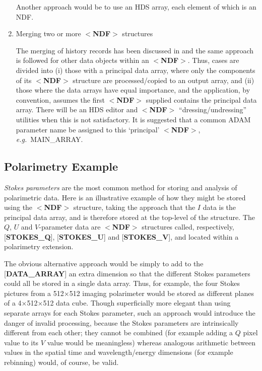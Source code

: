 \begin{enumerate}
\begin{tabbing}
\end{tabbing}

Another approach would be to use an HDS array, each
element of which is an NDF.

\item Merging two or more $<${\bf NDF}$>$ structures

The merging of history records has been discussed in
 and the same approach
is followed for other data objects within an $<${\bf NDF}$>$.
Thus, cases are divided into (i)
those with a principal data array, where only the
components of its $<${\bf NDF}$>$ structure are
processed/copied to an output array, and
(ii) those where the
data arrays have equal importance, and
the application, by convention, assumes the first $<${\bf NDF}$>$ supplied
contains the
principal data array.  There will be an HDS editor and $<${\bf NDF}$>$
``dressing/undressing'' utilities when this is not satisfactory.  It is
suggested that a common {\small ADAM} parameter name be assigned to this `principal'
$<${\bf NDF}$>$, {\it e.g.}\  MAIN\_ARRAY.
\end{enumerate}

\subsection{Polarimetry Example\label{se:expolarimetry}}

{\it Stokes parameters} are the most common method for storing and analysis
of polarimetric data.  Here is an illustrative
example of how they might be stored
using the $<${\bf NDF}$>$ structure, taking the approach that
the $I$ data is the principal data array, and is therefore
stored at the top-level of the structure.  The $Q$, $U$ and $V$-parameter data
are $<${\bf NDF}$>$ structures called, respectively,
{[}{\bf STOKES\_Q}{]}, {[}{\bf STOKES\_U}{]}
and {[}{\bf STOKES\_V}{]}, and
located within a polarimetry extension.

The obvious alternative approach would be simply to
add to the {[}{\bf DATA\_ARRAY}{]} an extra dimension so that
the different Stokes parameters could all be stored in a
single data array.  Thus, for example, the four Stokes pictures from a
512$\times$512 imaging polarimeter would be stored as different planes of a
4$\times$512$\times$512 data cube.
Though superficially more elegant than using
separate arrays for each Stokes parameter, such
an approach would introduce the danger
of invalid processing, because the Stokes
parameters are intrinsically different from each other; they cannot
be combined (for example adding a $Q$ pixel
value to its $V$ value would be meaningless)
whereas analogous arithmetic between values in the spatial
time and wavelength/energy dimensions (for example rebinning)
would, of course, be valid.


